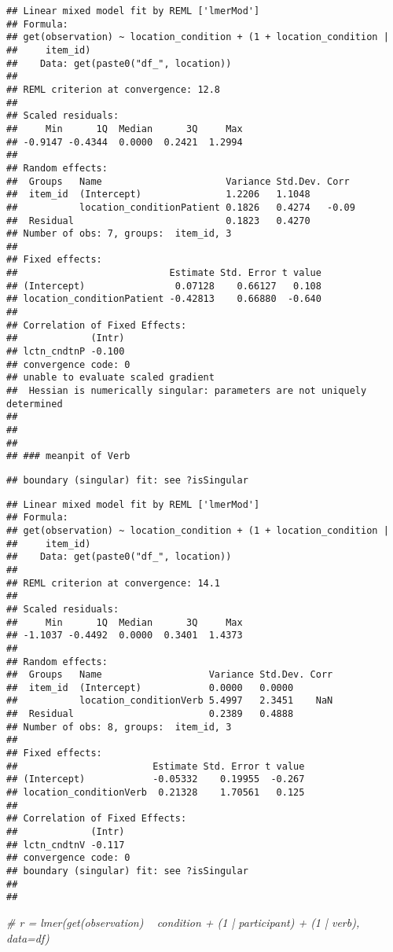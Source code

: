 \documentclass[]{article}
\newenvironment{Shaded}{\begin{snugshade}}{\end{snugshade}}
\newcommand{\CommentTok}[1]{\textcolor[rgb]{0.56,0.35,0.01}{\textit{#1}}}
\begin{document}
\begin{verbatim}
## Linear mixed model fit by REML ['lmerMod']
## Formula: 
## get(observation) ~ location_condition + (1 + location_condition |  
##     item_id)
##    Data: get(paste0("df_", location))
## 
## REML criterion at convergence: 12.8
## 
## Scaled residuals: 
##     Min      1Q  Median      3Q     Max 
## -0.9147 -0.4344  0.0000  0.2421  1.2994 
## 
## Random effects:
##  Groups   Name                      Variance Std.Dev. Corr 
##  item_id  (Intercept)               1.2206   1.1048        
##           location_conditionPatient 0.1826   0.4274   -0.09
##  Residual                           0.1823   0.4270        
## Number of obs: 7, groups:  item_id, 3
## 
## Fixed effects:
##                           Estimate Std. Error t value
## (Intercept)                0.07128    0.66127   0.108
## location_conditionPatient -0.42813    0.66880  -0.640
## 
## Correlation of Fixed Effects:
##             (Intr)
## lctn_cndtnP -0.100
## convergence code: 0
## unable to evaluate scaled gradient
##  Hessian is numerically singular: parameters are not uniquely determined
## 
##   
##   
## ### meanpit of Verb
\end{verbatim}

\begin{verbatim}
## boundary (singular) fit: see ?isSingular
\end{verbatim}

\begin{verbatim}
## Linear mixed model fit by REML ['lmerMod']
## Formula: 
## get(observation) ~ location_condition + (1 + location_condition |  
##     item_id)
##    Data: get(paste0("df_", location))
## 
## REML criterion at convergence: 14.1
## 
## Scaled residuals: 
##     Min      1Q  Median      3Q     Max 
## -1.1037 -0.4492  0.0000  0.3401  1.4373 
## 
## Random effects:
##  Groups   Name                   Variance Std.Dev. Corr
##  item_id  (Intercept)            0.0000   0.0000       
##           location_conditionVerb 5.4997   2.3451    NaN
##  Residual                        0.2389   0.4888       
## Number of obs: 8, groups:  item_id, 3
## 
## Fixed effects:
##                        Estimate Std. Error t value
## (Intercept)            -0.05332    0.19955  -0.267
## location_conditionVerb  0.21328    1.70561   0.125
## 
## Correlation of Fixed Effects:
##             (Intr)
## lctn_cndtnV -0.117
## convergence code: 0
## boundary (singular) fit: see ?isSingular
## 
## 
\end{verbatim}

\begin{Shaded}
\begin{Highlighting}[]
    \CommentTok{# r = lmer(get(observation) ~ condition + (1 | participant) + (1 | verb), data=df)}
\end{Highlighting}
\end{Shaded}
\end{document}

